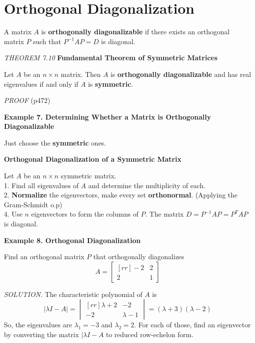 \documentclass{article}
\newcounter{Theo}[section]
\begin{document}
    \section{Orthogonal Diagonalization}
    A matrix $A$ is \textbf{orthogonally diagonalizable} if there exists an orthogonal matrix $P$ such that 
    $P^{-1}AP = D$ is diagonal.
    \begin{tcolorbox}[colback = {blue9}]
        \textit{THEOREM 7.10} \textbf{Fundamental Theorem of Symmetric Matrices}

        Let $A$ be an $n \times n$ matrix. Then $A$ is \textbf{orthogonally diagonalizable} and has real eigenvalues if and only if
        $A$ is \textbf{symmetric}.
    \end{tcolorbox}
    \textit{\textcolor{blue5}{PROOF}} (p472) 

    \textbf{Example 7. \textcolor{blue5}{Determining Whether a Matrix is Orthogonally Diagonalizable}}

    Just choose the \textbf{symmetric} ones.

    \begin{tcolorbox}[colback = {blue9}]
        \textbf{Orthogonal Diagonalization of a Symmetric Matrix}

        Let $A$ be an $n \times n$ symmetric matrix.\\
        1. Find all eigenvalues of $A$ and determine the multiplicity of each.\\
        2. \textbf{Normalize} the eigenvectors, make every set \textbf{orthonormal}. (Applying the Gram-Schmidt o.p) \\
        4. Use $n$ eigenvectors to form the columns of $P$. The matrix $D = P^{-1}AP = P^TAP$ is diagonal.
    \end{tcolorbox}

    \textbf{Example 8. \textcolor{blue5}{Orthogonal Diagonalization}}

    Find an orthogonal matrix $P$ that orthogonally diagonalizes
    \[A = \begin{bmatrix}[rr]
        -2 & 2 \\
        2 & 1
    \end{bmatrix} \]

    \textit{\textcolor{blue5}{SOLUTION.}} The characteristic polynomial of $A$ is
    \[| \lambda I - A| = \begin{vmatrix}[rr]
        \lambda  + 2 & -2 \\
        -2 & \lambda  - 1
    \end{vmatrix} = ( \lambda  + 3 )( \lambda  - 2 )\]
    So, the eigenvalues are $ \lambda _1 = -3$ and $ \lambda _2 = 2$. For each of those, find an eigenvector by converting the matrix
    $| \lambda I - A$ to reduced row-echelon form.
    
\end{document}
